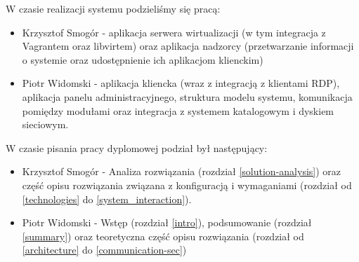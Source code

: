 \documentclass[../wstep.tex]{subfiles}
\begin{document}
W czasie realizacji systemu podzieliśmy się pracą:
\begin{itemize}
    \item Krzysztof Smogór - aplikacja serwera wirtualizacji (w tym integracja z Vagrantem oraz libvirtem) oraz aplikacja nadzorcy (przetwarzanie informacji o systemie oraz udostępnienie ich aplikacjom klienckim)
    \item Piotr Widomski - aplikacja kliencka (wraz z integracją z klientami RDP), aplikacja panelu administracyjnego, struktura modelu systemu, komunikacja pomiędzy modułami oraz integracja z systemem katalogowym i dyskiem sieciowym.
\end{itemize}

W czasie pisania pracy dyplomowej podział był następujący:
\begin{itemize}
    \item Krzysztof Smogór - Analiza rozwiązania (rozdział \ref{solution-analysis}) oraz część opisu rozwiązania związana z konfiguracją i wymaganiami (rozdział od \ref{technologies} do \ref{system_interaction}).
    \item Piotr Widomski - Wstęp (rozdział \ref{intro}), podsumowanie (rozdział \ref{summary}) oraz teoretyczna część opisu rozwiązania (rozdział od \ref{architecture} do \ref{communication-sec})
\end{itemize}
\end{document}
